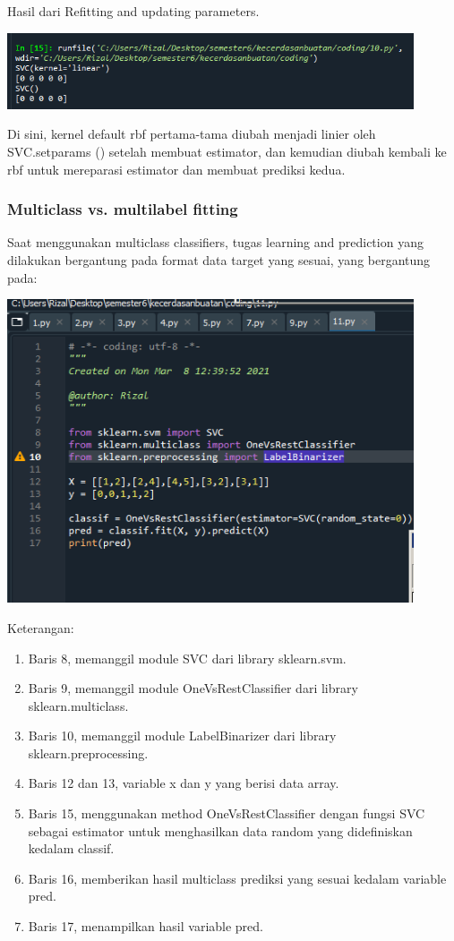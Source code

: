 \documentclass{article}
\begin{document}
Hasil dari Refitting and updating parameters.
    
    \begin{center}
    \includegraphics[width=12cm]{figures/1184033/chapter1/24.PNG}
    \end{center}


Di sini, kernel default rbf pertama-tama diubah menjadi linier oleh SVC.setparams () setelah membuat estimator, dan kemudian diubah kembali ke rbf untuk mereparasi estimator dan membuat prediksi kedua.

\subsubsection{Multiclass vs. multilabel fitting}

Saat menggunakan multiclass classifiers, tugas learning and prediction yang dilakukan bergantung pada format data target yang sesuai, yang bergantung pada:

    \begin{center}
    \includegraphics[width=12cm]{figures/1184033/chapter1/25.PNG}
    \end{center}

Keterangan:
    \begin{enumerate}
\item Baris 8, memanggil module SVC dari library sklearn.svm.
\item Baris 9, memanggil module OneVsRestClassifier dari library sklearn.multiclass.
\item Baris 10, memanggil module LabelBinarizer dari library sklearn.preprocessing.
\item Baris 12 dan 13, variable x dan y yang berisi data array.
\item Baris 15, menggunakan method OneVsRestClassifier dengan fungsi SVC sebagai estimator untuk menghasilkan data random yang didefiniskan kedalam classif.
\item Baris 16, memberikan hasil multiclass prediksi yang sesuai kedalam variable pred.
\item Baris 17, menampilkan hasil variable pred.
    \end{enumerate}
\end{document}
